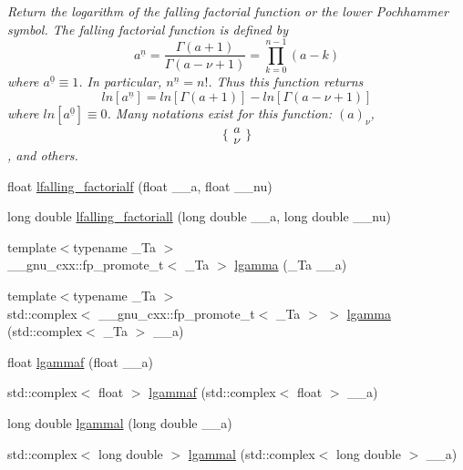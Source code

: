 \begin{DoxyCompactItemize}
\begin{DoxyCompactList}\small\item\em Return the logarithm of the falling factorial function or the lower Pochhammer symbol. The falling factorial function is defined by \[ a^{\underline{n}} = \frac{\Gamma(a + 1)}{\Gamma(a - \nu + 1)} = \prod_{k=0}^{n-1} (a - k) \] where $ a^{\underline{0}} \equiv 1 $. In particular, $ n^{\underline{n}} = n! $. Thus this function returns \[ ln[a^{\underline{n}}] = ln[\Gamma(a + 1)] - ln[\Gamma(a - \nu + 1)] \] where $ ln[a^{\underline{0}}] \equiv 0 $. Many notations exist for this function\+: $ (a)_\nu $, \[ \{ \begin{array}{c} a \\ \nu \end{array} \} \], and others. \end{DoxyCompactList}\item 
float \hyperlink{group__gnu__math__spec__func_ga59ad7045c90aa1e3bc671e2eb6b8a2a7}{lfalling\+\_\+factorialf} (float \+\_\+\+\_\+a, float \+\_\+\+\_\+nu)
\item 
long double \hyperlink{group__gnu__math__spec__func_gaa69b6c70e000b073d7f0f17199b1feb0}{lfalling\+\_\+factoriall} (long double \+\_\+\+\_\+a, long double \+\_\+\+\_\+nu)
\item 
{\footnotesize template$<$typename \+\_\+\+Ta $>$ }\\\+\_\+\+\_\+gnu\+\_\+cxx\+::fp\+\_\+promote\+\_\+t$<$ \+\_\+\+Ta $>$ \hyperlink{group__gnu__math__spec__func_ga40fa5127f7c419ed1d8f1c6a6f96ea9b}{lgamma} (\+\_\+\+Ta \+\_\+\+\_\+a)
\item 
{\footnotesize template$<$typename \+\_\+\+Ta $>$ }\\std\+::complex$<$ \+\_\+\+\_\+gnu\+\_\+cxx\+::fp\+\_\+promote\+\_\+t$<$ \+\_\+\+Ta $>$ $>$ \hyperlink{group__gnu__math__spec__func_ga93530dc48fbf301835215cdffedc42d8}{lgamma} (std\+::complex$<$ \+\_\+\+Ta $>$ \+\_\+\+\_\+a)
\item 
float \hyperlink{group__gnu__math__spec__func_ga37956b360838b5b2f98c8e5cfd15d307}{lgammaf} (float \+\_\+\+\_\+a)
\item 
std\+::complex$<$ float $>$ \hyperlink{group__gnu__math__spec__func_ga5b10ee6e92d8707a151b00086889b2ea}{lgammaf} (std\+::complex$<$ float $>$ \+\_\+\+\_\+a)
\item 
long double \hyperlink{group__gnu__math__spec__func_gabc66f234f4554cd5ff878792cc85bd37}{lgammal} (long double \+\_\+\+\_\+a)
\item 
std\+::complex$<$ long double $>$ \hyperlink{group__gnu__math__spec__func_ga5f12f60afe9a47f4ca04964f642bbf0d}{lgammal} (std\+::complex$<$ long double $>$ \+\_\+\+\_\+a)

\end{DoxyCompactItemize}
